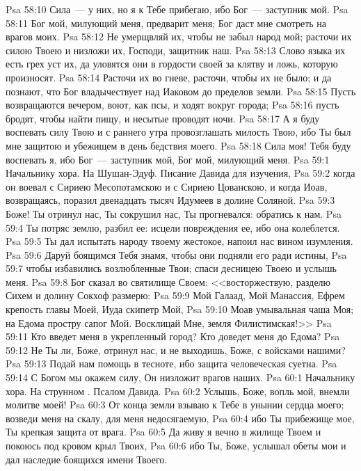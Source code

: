 \vs Psa 58:10 Сила~--- у них, но я к Тебе прибегаю, ибо Бог~--- заступник мой.
\vs Psa 58:11 Бог мой, милующий меня, предварит меня; Бог даст мне смотреть на врагов моих.
\vs Psa 58:12 Не умерщвляй их, чтобы не забыл народ мой; расточи их силою Твоею и низложи их, Господи, защитник наш.
\vs Psa 58:13 Слово языка их есть грех уст их, да уловятся они в гордости своей за клятву и ложь, которую произносят.
\vs Psa 58:14 Расточи их во гневе, расточи, чтобы их не было; и да познают, что Бог владычествует над Иаковом до пределов земли.
\vs Psa 58:15 Пусть возвращаются вечером, воют, как псы, и ходят вокруг города;
\vs Psa 58:16 пусть бродят, чтобы найти пищу, и несытые проводят ночи.
\vs Psa 58:17 А я буду воспевать силу Твою и с раннего утра провозглашать милость Твою, ибо Ты был мне защитою и убежищем в день бедствия моего.
\vs Psa 58:18 Сила моя! Тебя буду воспевать я, ибо Бог~--- заступник мой, Бог мой, милующий меня.
\vs Psa 59:1 Начальнику хора. На  Шушан-Эдуф. Писание Давида для изучения,
\vs Psa 59:2 когда он воевал с Сириею Месопотамскою и с Сириею Цованскою, и когда Иоав, возвращаясь, поразил двенадцать тысяч Идумеев в долине Соляной.
\rsbpar\vs Psa 59:3 Боже! Ты отринул нас, Ты сокрушил нас, Ты прогневался: обратись к нам.
\vs Psa 59:4 Ты потряс землю, разбил ее: исцели повреждения ее, ибо она колеблется.
\vs Psa 59:5 Ты дал испытать народу твоему жестокое, напоил нас вином изумления.
\vs Psa 59:6 Даруй боящимся Тебя знамя, чтобы они подняли его ради истины,
\vs Psa 59:7 чтобы избавились возлюбленные Твои; спаси десницею Твоею и услышь меня.
\vs Psa 59:8 Бог сказал во святилище Своем: <<восторжествую, разделю Сихем и долину Сокхоф размерю:
\vs Psa 59:9 Мой Галаад, Мой Манассия, Ефрем крепость главы Моей, Иуда скипетр Мой,
\vs Psa 59:10 Моав умывальная чаша Моя; на Едома простру сапог Мой. Восклицай Мне, земля Филистимская!>>
\vs Psa 59:11 Кто введет меня в укрепленный город? Кто доведет меня до Едома?
\vs Psa 59:12 Не Ты ли, Боже,  отринул нас, и не выходишь, Боже, с войсками нашими?
\vs Psa 59:13 Подай нам помощь в тесноте, ибо защита человеческая суетна.
\vs Psa 59:14 С Богом мы окажем силу, Он низложит врагов наших.
\vs Psa 60:1 Начальнику хора. На струнном . Псалом Давида.
\rsbpar\vs Psa 60:2 Услышь, Боже, вопль мой, внемли молитве моей!
\vs Psa 60:3 От конца земли взываю к Тебе в унынии сердца моего; возведи меня на скалу, для меня недосягаемую,
\vs Psa 60:4 ибо Ты прибежище мое, Ты крепкая защита от врага.
\vs Psa 60:5 Да живу я вечно в жилище Твоем и покоюсь под кровом крыл Твоих,
\vs Psa 60:6 ибо Ты, Боже, услышал обеты мои и дал  наследие боящихся имени Твоего.

